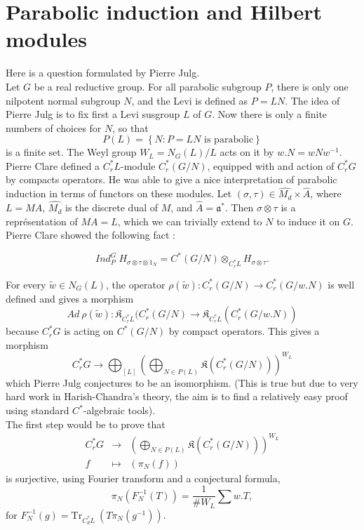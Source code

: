 \section{Parabolic induction and Hilbert modules}

Here is a question formulated by Pierre Julg. \\

Let $G$ be a real reductive group. For all parabolic subgroup $P$, there is only one nilpotent normal subgroup $N$, and the Levi is defined as $P=LN$. The idea of Pierre Julg is to fix first a Levi susgroup $L$ of $G$. Now there is only a finite numbers of choices for $N$, so that
\[P(L)=\left\{N : P=LN \text{ is parabolic}\right\}\]
is a finite set. The Weyl group $W_L = N_G(L)/L$ acts on it by $w.N = wNw^{-1}$.\\
Pierre Clare defined a $C^*_r L$-module $C^*_r(G/N)$, equipped with and action of $C^*_r G$ by compacts operators. He was able to give a nice interpretation of parabolic induction in terms of functors on these modules. Let $(\sigma,\tau)\in \hat{M_d}\times \hat A$, where $L=MA$, $\hat{M_d}$ is the discrete dual of $M$, and $\hat A = \mathfrak a^*$. Then $\sigma\otimes \tau$ is a représentation of $MA=L$, which we can trivially extend to $N$ to induce it on $G$. Pierre Clare showed the following fact :

\[Ind_P^G \ H_{\sigma\otimes\tau\otimes 1_N} = C^*(G/N)\otimes_{C^*_rL} H_{\sigma\otimes\tau}.\] 

For every $\tilde w\in N_G(L)$, the operator $\rho(\tilde w) : C_r^*(G/N)\rightarrow C_r^*(G/w.N)$ is well defined and gives a morphism
\[Ad \ \rho(\tilde w) : \mathfrak K_{C_r^*L}(C_r^*(G/N)\rightarrow \mathfrak K_{C_r^*L}(C_r^*(G/w.N))\] 
because $C_r^*G$ is acting on $C^*(G/N)$ by compact operators. This gives a morphism
\[C^*_r G \rightarrow \bigoplus_{[L]} \left(\bigoplus_{N\in P(L)} \mathfrak K(C^*_r(G/N))\right)^{W_L}\] 
which Pierre Julg conjectures to be an isomorphism. (This is true but due to very hard work in Harish-Chandra's theory, the aim is to find a relatively easy proof using standard $C^*$-algebraic tools).\\

The first step would be to prove that 
\[\begin{array}{rcl}C^*_r G & \rightarrow & \left(\bigoplus_{N\in P(L)} \mathfrak K(C^*_r(G/N))\right)^{W_L}\\
f &\mapsto & (\pi_N(f))\end{array}\] 
is surjective, using Fourier transform and a conjectural formula, 
\[\pi_N(F^{-1}_N(T))=\frac{1}{\# W_L}\sum w.T,\]
 for $F^{-1}_N(g)=\text{Tr}_{C_d^*L}\ (T\pi_N(g^{-1}))$.

